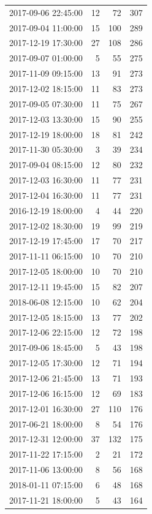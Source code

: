 \begin{tabular}{lrrr}
2017-09-06 22:45:00 & 12 & 72 & 307 \\
2017-09-04 11:00:00 & 15 & 100 & 289 \\
2017-12-19 17:30:00 & 27 & 108 & 286 \\
2017-09-07 01:00:00 & 5 & 55 & 275 \\
2017-11-09 09:15:00 & 13 & 91 & 273 \\
2017-12-02 18:15:00 & 11 & 83 & 273 \\
2017-09-05 07:30:00 & 11 & 75 & 267 \\
2017-12-03 13:30:00 & 15 & 90 & 255 \\
2017-12-19 18:00:00 & 18 & 81 & 242 \\
2017-11-30 05:30:00 & 3 & 39 & 234 \\
2017-09-04 08:15:00 & 12 & 80 & 232 \\
2017-12-03 16:30:00 & 11 & 77 & 231 \\
2017-12-04 16:30:00 & 11 & 77 & 231 \\
2016-12-19 18:00:00 & 4 & 44 & 220 \\
2017-12-02 18:30:00 & 19 & 99 & 219 \\
2017-12-19 17:45:00 & 17 & 70 & 217 \\
2017-11-11 06:15:00 & 10 & 70 & 210 \\
2017-12-05 18:00:00 & 10 & 70 & 210 \\
2017-12-11 19:45:00 & 15 & 82 & 207 \\
2018-06-08 12:15:00 & 10 & 62 & 204 \\
2017-12-05 18:15:00 & 13 & 77 & 202 \\
2017-12-06 22:15:00 & 12 & 72 & 198 \\
2017-09-06 18:45:00 & 5 & 43 & 198 \\
2017-12-05 17:30:00 & 12 & 71 & 194 \\
2017-12-06 21:45:00 & 13 & 71 & 193 \\
2017-12-06 16:15:00 & 12 & 69 & 183 \\
2017-12-01 16:30:00 & 27 & 110 & 176 \\
2017-06-21 18:00:00 & 8 & 54 & 176 \\
2017-12-31 12:00:00 & 37 & 132 & 175 \\
2017-11-22 17:15:00 & 2 & 21 & 172 \\
2017-11-06 13:00:00 & 8 & 56 & 168 \\
2018-01-11 07:15:00 & 6 & 48 & 168 \\
2017-11-21 18:00:00 & 5 & 43 & 164 \\

\end{tabular}
